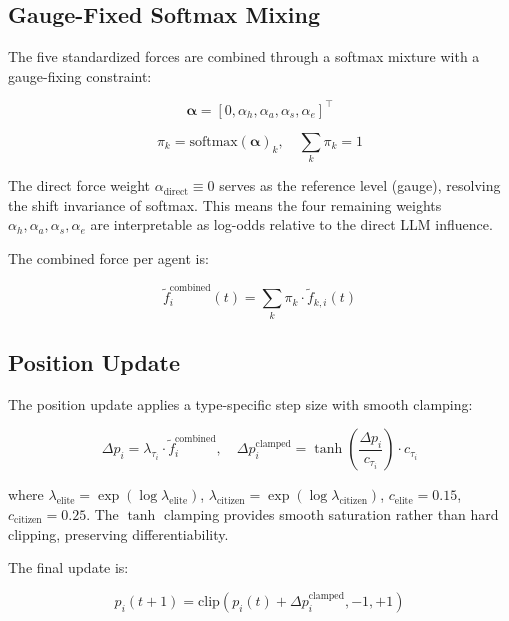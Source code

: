 \documentclass[12pt]{article}
\begin{document}
\subsection{Gauge-Fixed Softmax Mixing}

The five standardized forces are combined through a softmax mixture with a gauge-fixing constraint:

\begin{equation}\label{eq:7}
\boldsymbol{\alpha} = [0, \alpha_h, \alpha_a, \alpha_s, \alpha_e]^\top
\end{equation}

\begin{equation}\label{eq:8}
\pi_k = \text{softmax}(\boldsymbol{\alpha})_k, \quad \sum_k \pi_k = 1
\end{equation}

The direct force weight $\alpha_{\text{direct}} \equiv 0$ serves as the reference level (gauge), resolving the shift invariance of softmax. This means the four remaining weights $\alpha_h, \alpha_a, \alpha_s, \alpha_e$ are interpretable as log-odds relative to the direct LLM influence.

The combined force per agent is:

\begin{equation}\label{eq:9}
\tilde{f}_i^{\text{combined}}(t) = \sum_k \pi_k \cdot \tilde{f}_{k,i}(t)
\end{equation}

\subsection{Position Update}

The position update applies a type-specific step size with smooth clamping:

\begin{equation}\label{eq:10}
\Delta p_i = \lambda_{\tau_i} \cdot \tilde{f}_i^{\text{combined}}, \quad \Delta p_i^{\text{clamped}} = \tanh\!\left(\frac{\Delta p_i}{c_{\tau_i}}\right) \cdot c_{\tau_i}
\end{equation}

where $\lambda_{\text{elite}} = \exp(\log \lambda_{\text{elite}})$, $\lambda_{\text{citizen}} = \exp(\log \lambda_{\text{citizen}})$, $c_{\text{elite}} = 0.15$, $c_{\text{citizen}} = 0.25$. The $\tanh$ clamping provides smooth saturation rather than hard clipping, preserving differentiability.

The final update is:

\begin{equation}\label{eq:11}
p_i(t+1) = \text{clip}(p_i(t) + \Delta p_i^{\text{clamped}}, -1, +1)
\end{equation}
\end{document}
